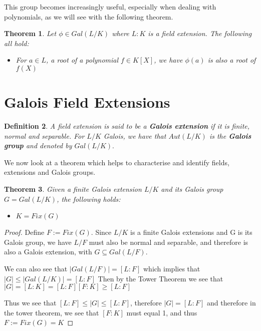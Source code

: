 \documentclass[12pt]{article}
\newtheorem{theorem}{Theorem}
\newtheorem{definition}[theorem]{Definition}
\begin{document}
This group becomes increasingly useful, especially when dealing with
polynomials, as we will see with the following theorem.

\begin{theorem}
    Let $\phi \in Gal(L/K)$ where $L:K$ is a field extension. The following all
    hold:
    \begin{itemize}
        \item For $a \in L$, a root of a polynomial $f \in K[X]$, we have
              $\phi(a)$
              is also a root of $f(X)$
    \end{itemize}
\end{theorem}

\section{Galois Field Extensions}
\begin{definition}
    A field extension is said to be a \textbf{Galois extension} if it is
    finite,
    normal and separable. For $L/K$ Galois, we have that $Aut(L/K)$ is the
    \textbf{Galois group} and denoted by $Gal(L/K).$
\end{definition}

\noindent We now look at a theorem which helps to characterise and identify
fields, extensions and Galois groups.

\begin{theorem}
    Given a finite Galois extension $L/K$ and its Galois group $G=Gal(L/K)$,
    the following holds:
    \begin{itemize}
        \item $K = Fix(G)$
    \end{itemize}
\end{theorem}

\begin{proof}
    Define $F:=Fix(G)$. Since $L/K$ is a finite Galois extensions and G is its
    Galois group, we have $L/F$ must also be normal and separable, and
    therefore is
    also a Galois extension, with $G \subseteq Gal(L/F)$.

    \noindent We can also see that $|Gal(L/F)| = [L:F]$ which implies that
    $|G|\leq|Gal(L/K)|=[L:F]$
    Then by the Tower Theorem we see that $|G|=[L:K]=[L:F][F:K]\geq [L:F]$

    Thus we see that $[L:F]\leq|G|\leq[L:F]$, therefore $|G|=[L:F]$ and
    therefore
    in the tower theorem, we see that $[F:K]$ must equal 1, and thus $F:=Fix(G)
        =
        K$
\end{proof}
\end{document}
